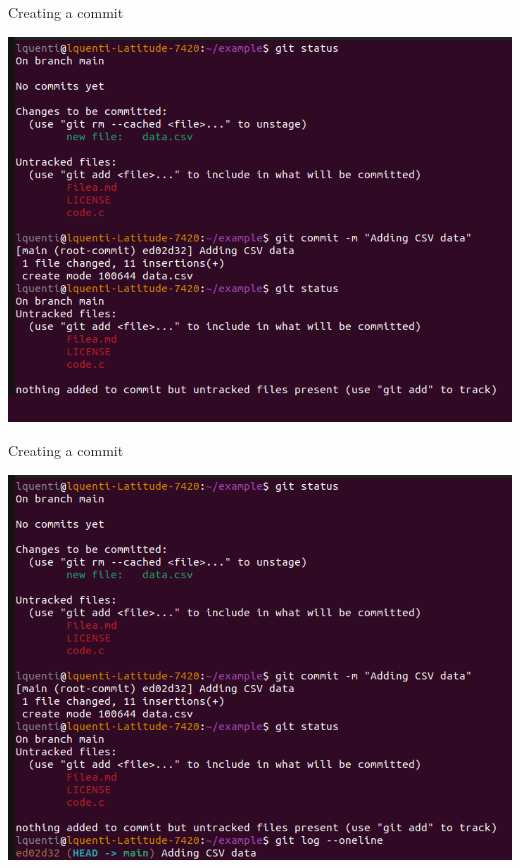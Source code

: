 \documentclass[compress,aspectratio=169]{beamer}
\begin{document}
  \begin{frame}[noframenumbering]{Creating a commit}
    \begin{center}
      \includegraphics[height=0.85\textheight]{./assets/terminal_slideshows/02_commits_03.png}
    \end{center}
  \end{frame}
  \begin{frame}[noframenumbering]{Creating a commit}
    \begin{center}
      \includegraphics[height=0.85\textheight]{./assets/terminal_slideshows/02_commits_04.png}
    \end{center}
  \end{frame}
\end{document}
